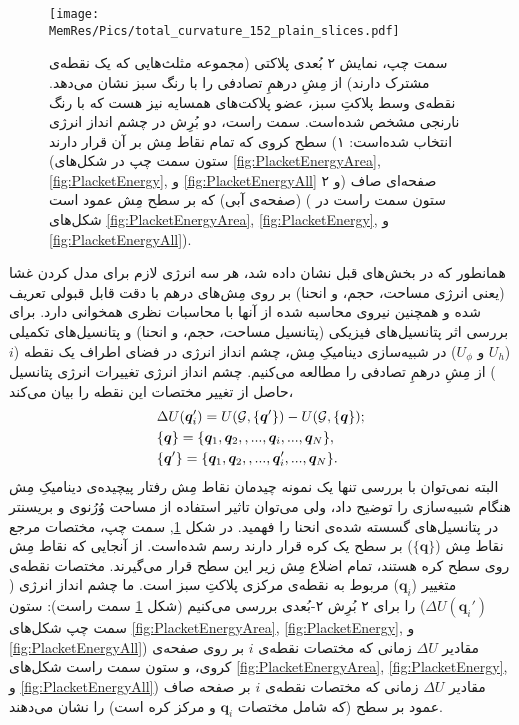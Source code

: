 \begin{figure}[h]
\begin{center}
\texttt{[image: \\MemRes/Pics/total\_curvature\_152\_plain\_slices.pdf]}
\caption{
سمت چپ، نمایش ۲ بُعدی پلاکتی (مجموعه مثلث‌هایی که یک نقطه‌ی مشترک دارند) از مِشِ درهمِ تصادفی را با رنگ سبز نشان می‌دهد. نقطه‌ی وسط پلاکتِ سبز، عضو پلاکت‌های همسایه‌ نیز هست که با رنگ نارنجی مشخص شده‌است. سمت راست، دو بُرِش در چشم انداز انرژی انتخاب شده‌است: ۱) سطح کروی که تمام نقاط مِش بر آن قرار دارند (ستون سمت چپ در شکل‌های
\ref{fig:PlacketEnergyArea}, \ref{fig:PlacketEnergy},
و
\ref{fig:PlacketEnergyAll}
و ۲)  صفحه‌ای صاف (صفحه‌ی آبی) که بر سطح مِش عمود است ( ستون سمت راست در شکل‌های 
\ref{fig:PlacketEnergyArea}, \ref{fig:PlacketEnergy},
و
\ref{fig:PlacketEnergyAll}).
}
\label{fig:PlacketRepresentaion}
\end{center}
\end{figure}
همانطور که در بخش‌های قبل نشان داده شد، هر سه انرژی لازم برای مدل کردن غشا (یعنی انرژی مساحت، حجم، و انحنا) بر روی مِش‌های درهم با دقت قابل قبولی تعریف شده و همچنین نیروی محاسبه شده از آنها با محاسبات نظری همخوانی دارد. برای بررسی اثر پتانسیل‌های فیزیکی (پتانسیل مساحت، حجم، و انحنا) و پتانسیل‌های تکمیلی 
($U_h$
و
$U_\phi$)
 در شبیه‌سازی دینامیکِ مِش، چشم انداز انرژی در فضای اطراف یک نقطه
 ($i$)
  از مِشِ درهمِ تصادفی را مطالعه می‌کنیم. چشم انداز انرژی تغییرات انرژی پتانسیل حاصل از تغییر مختصات این نقطه را بیان می‌کند،
  \begin{equation}
\begin{aligned}
&\Delta U(\bm q_{i}') = U({\cal G}, \{\bm q'\}) - U({\cal G}, \{\bm q\});\\
&\{\bm q\}=\{\bm q_1, \bm q_2, , ..., \bm q_{i},...,\bm q_N\},\\
&\{\bm q'\}=\{\bm q_1, \bm q_2, , ..., \bm q_{i}',...,\bm q_N\}.
\label{eq:energyLandscape}
\end{aligned}
\end{equation}
البته نمی‌توان با بررسی تنها یک نمونه چیدمان‌ نقاط مِش‌ رفتار پیچیده‌ی دینامیکِ مِش هنگام شبیه‌سازی را توضیح داد، ولی می‌توان تاثیر استفاده از مساحت وُرُنوی و بریسنتر در پتانسیل‌های گسسته شده‌ی انحنا را فهمید. در شکل 
\ref{fig:PlacketRepresentaion},
سمت چپ، مختصات مرجع نقاط مِش
($\{{\bm q}\}$)
بر سطح یک کره قرار دارند رسم شده‌است. از آنجایی که نقاط مِش روی سطح کره هستند، تمام اضلاع مِش زیر این سطح قرار می‌گیرند. مختصات نقطه‌ی متغییر
(${\bm q_i}$)
مربوط به نقطه‌ی مرکزی پلاکتِ سبز است. ما چشم انداز انرژی 
($\Delta U({\bm q_i'})$)
را برای ۲ بُرِش ۲-بُعدی بررسی می‌کنیم (شکل
\ref{fig:PlacketRepresentaion}
سمت راست): ستون سمت چپ شکل‌های 
\ref{fig:PlacketEnergyArea}, \ref{fig:PlacketEnergy},
و
\ref{fig:PlacketEnergyAll})
مقادیر 
$\Delta U$
زمانی که مختصات نقطه‌ی 
$i$
بر روی صفحه‌ی کروی، و ستون سمت راست شکل‌های 
\ref{fig:PlacketEnergyArea}, \ref{fig:PlacketEnergy},
و
\ref{fig:PlacketEnergyAll})
مقادیر 
$\Delta U$
زمانی که مختصات نقطه‌ی 
$i$
بر صفحه صاف عمود بر سطح (که شامل مختصات
${\bm q_i}$
و مرکز کره است) را نشان می‌دهند.
 

